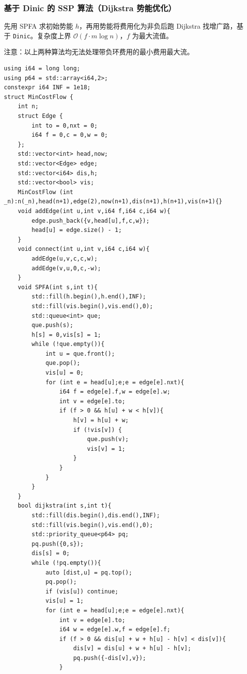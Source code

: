 \subsubsection{基于 Dinic 的 SSP 算法（Dijkstra 势能优化）}

先用 SPFA 求初始势能 $h$，再用势能将费用化为非负后跑 Dijkstra 找增广路，基于 \texttt{Dinic}。复杂度上界 $\mathcal{O}(f\cdot m\log n)$，$f$ 为最大流值。

注意：以上两种算法均无法处理带负环费用的最小费用最大流。

\begin{lstlisting}
using i64 = long long;
using p64 = std::array<i64,2>;
constexpr i64 INF = 1e18;
struct MinCostFlow {
    int n;
    struct Edge {
        int to = 0,nxt = 0;
        i64 f = 0,c = 0,w = 0;
    };
    std::vector<int> head,now;
    std::vector<Edge> edge;
    std::vector<i64> dis,h;
    std::vector<bool> vis;
    MinCostFlow (int _n):n(_n),head(n+1),edge(2),now(n+1),dis(n+1),h(n+1),vis(n+1){}
    void addEdge(int u,int v,i64 f,i64 c,i64 w){
        edge.push_back({v,head[u],f,c,w});
        head[u] = edge.size() - 1;
    }
    void connect(int u,int v,i64 c,i64 w){
        addEdge(u,v,c,c,w);
        addEdge(v,u,0,c,-w);
    }
    void SPFA(int s,int t){
        std::fill(h.begin(),h.end(),INF);
        std::fill(vis.begin(),vis.end(),0);
        std::queue<int> que;
        que.push(s);
        h[s] = 0,vis[s] = 1;
        while (!que.empty()){
            int u = que.front();
            que.pop();
            vis[u] = 0;
            for (int e = head[u];e;e = edge[e].nxt){
                i64 f = edge[e].f,w = edge[e].w;
                int v = edge[e].to;
                if (f > 0 && h[u] + w < h[v]){
                    h[v] = h[u] + w;
                    if (!vis[v]) {
                        que.push(v);
                        vis[v] = 1;
                    }
                }
            }
        }
    }
    bool dijkstra(int s,int t){
        std::fill(dis.begin(),dis.end(),INF);
        std::fill(vis.begin(),vis.end(),0);
        std::priority_queue<p64> pq;
        pq.push({0,s});
        dis[s] = 0;
        while (!pq.empty()){
            auto [dist,u] = pq.top();
            pq.pop();
            if (vis[u]) continue;
            vis[u] = 1;
            for (int e = head[u];e;e = edge[e].nxt){
                int v = edge[e].to;
                i64 w = edge[e].w,f = edge[e].f;
                if (f > 0 && dis[u] + w + h[u] - h[v] < dis[v]){
                    dis[v] = dis[u] + w + h[u] - h[v];
                    pq.push({-dis[v],v});
                }

\end{lstlisting}

